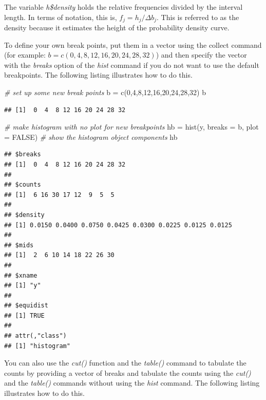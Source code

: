 \documentclass[
]{book}
\newenvironment{Shaded}{\begin{snugshade}}{\end{snugshade}}
\newcommand{\AttributeTok}[1]{\textcolor[rgb]{0.77,0.63,0.00}{#1}}
\newcommand{\CommentTok}[1]{\textcolor[rgb]{0.56,0.35,0.01}{\textit{#1}}}
\newcommand{\ConstantTok}[1]{\textcolor[rgb]{0.00,0.00,0.00}{#1}}
\newcommand{\DecValTok}[1]{\textcolor[rgb]{0.00,0.00,0.81}{#1}}
\newcommand{\FunctionTok}[1]{\textcolor[rgb]{0.00,0.00,0.00}{#1}}
\newcommand{\NormalTok}[1]{#1}
\newcommand{\OtherTok}[1]{\textcolor[rgb]{0.56,0.35,0.01}{#1}}
\theoremstyle{definition}
\theoremstyle{definition}
\theoremstyle{definition}
\theoremstyle{definition}
\theoremstyle{remark}
\begin{document}
The variable \emph{h\$density} holds the relative frequencies divided by the
interval length. In terms of notation, this is, \(f_j = h_j/\Delta b_j\).
This is referred to as the density because it estimates the height of
the probability density curve.

To define your own break points, put them in a vector using the collect
command (for example: \(b = c(0,4,8,12,16,20,24,28,32)\)) and then specify
the vector with the \emph{breaks} option of the \emph{hist} command if you do not
want to use the default breakpoints. The following listing illustrates
how to do this.

\begin{Shaded}
\begin{Highlighting}[]
\CommentTok{\# set up some new break points}
\NormalTok{b }\OtherTok{=} \FunctionTok{c}\NormalTok{(}\DecValTok{0}\NormalTok{,}\DecValTok{4}\NormalTok{,}\DecValTok{8}\NormalTok{,}\DecValTok{12}\NormalTok{,}\DecValTok{16}\NormalTok{,}\DecValTok{20}\NormalTok{,}\DecValTok{24}\NormalTok{,}\DecValTok{28}\NormalTok{,}\DecValTok{32}\NormalTok{)}
\NormalTok{b}
\end{Highlighting}
\end{Shaded}

\begin{verbatim}
## [1]  0  4  8 12 16 20 24 28 32
\end{verbatim}

\begin{Shaded}
\begin{Highlighting}[]
\CommentTok{\# make histogram with no plot for new breakpoints}
\NormalTok{hb }\OtherTok{=} \FunctionTok{hist}\NormalTok{(y, }\AttributeTok{breaks =}\NormalTok{ b, }\AttributeTok{plot =} \ConstantTok{FALSE}\NormalTok{)}
\CommentTok{\# show the histogram object components}
\NormalTok{hb}
\end{Highlighting}
\end{Shaded}

\begin{verbatim}
## $breaks
## [1]  0  4  8 12 16 20 24 28 32
## 
## $counts
## [1]  6 16 30 17 12  9  5  5
## 
## $density
## [1] 0.0150 0.0400 0.0750 0.0425 0.0300 0.0225 0.0125 0.0125
## 
## $mids
## [1]  2  6 10 14 18 22 26 30
## 
## $xname
## [1] "y"
## 
## $equidist
## [1] TRUE
## 
## attr(,"class")
## [1] "histogram"
\end{verbatim}

You can also use the \emph{cut()} function and the \emph{table()} command to
tabulate the counts by providing a vector of breaks and tabulate the
counts using the \emph{cut()} and the \emph{table()} commands without using the
\emph{hist} command. The following listing illustrates how to do this.
\end{document}
